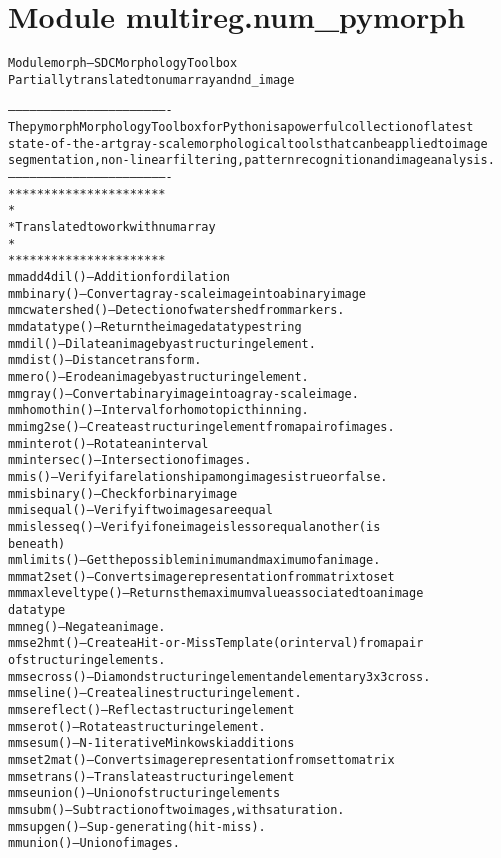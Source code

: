 %
%
%


\section{Module multireg.num\_pymorph}

    \label{multireg:num_pymorph}
\begin{alltt}
Module morph -- SDC Morphology Toolbox 
    Partially translated to numarray and nd\_image 
    
-------------------------------------------------------------------
The pymorph Morphology Toolbox for Python is a powerful collection of latest
state-of-the-art gray-scale morphological tools that can be applied to image
segmentation, non-linear filtering, pattern recognition and image analysis.
-------------------------------------------------------------------
**********************
*
* Translated to work with numarray
*
**********************
mmadd4dil()      -- Addition for dilation
mmbinary()       -- Convert a gray-scale image into a binary image
mmcwatershed()   -- Detection of watershed from markers.
mmdatatype()     -- Return the image datatype string
mmdil()          -- Dilate an image by a structuring element.
mmdist()         -- Distance transform.
mmero()          -- Erode an image by a structuring element.
mmgray()         -- Convert a binary image into a gray-scale image.
mmhomothin()     -- Interval for homotopic thinning.
mmimg2se()       -- Create a structuring element from a pair of images.
mminterot()      -- Rotate an interval
mmintersec()     -- Intersection of images.
mmis()           -- Verify if a relationship among images is true or false.
mmisbinary()     -- Check for binary image
mmisequal()      -- Verify if two images are equal
mmislesseq()     -- Verify if one image is less or equal another (is
                    beneath)
mmlimits()       -- Get the possible minimum and maximum of an image.
mmmat2set()      -- Converts image representation from matrix to set
mmmaxleveltype() -- Returns the maximum value associated to an image
                    datatype
mmneg()          -- Negate an image.
mmse2hmt()       -- Create a Hit-or-Miss Template (or interval) from a pair
                    of structuring elements.
mmsecross()      -- Diamond structuring element and elementary 3x3 cross.
mmseline()       -- Create a line structuring element.
mmsereflect()    -- Reflect a structuring element
mmserot()        -- Rotate a structuring element.
mmsesum()        -- N-1 iterative Minkowski additions
mmset2mat()      -- Converts image representation from set to matrix
mmsetrans()      -- Translate a structuring element
mmseunion()      -- Union of structuring elements
mmsubm()         -- Subtraction of two images, with saturation.
mmsupgen()       -- Sup-generating (hit-miss).
mmunion()        -- Union of images.


\end{alltt}
